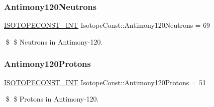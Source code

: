 \subsubsection{\texorpdfstring{Antimony120\+Neutrons}{Antimony120Neutrons}}
{\footnotesize\ttfamily \mbox{\hyperlink{group___isotope_const-_macros_ga5f18360b3e99483a35c32d789e62621c}{I\+S\+O\+T\+O\+P\+E\+C\+O\+N\+S\+T\+\_\+\+I\+NT}} Isotope\+Const\+::\+Antimony120\+Neutrons = 69}

\$ \$ Neutrons in Antimony-\/120. \mbox{\label{group___isotope_const-_antimony-_sb120_gab80ec5d7710e7b3fb6d69632f948da6b}} 
\subsubsection{\texorpdfstring{Antimony120\+Protons}{Antimony120Protons}}
{\footnotesize\ttfamily \mbox{\hyperlink{group___isotope_const-_macros_ga5f18360b3e99483a35c32d789e62621c}{I\+S\+O\+T\+O\+P\+E\+C\+O\+N\+S\+T\+\_\+\+I\+NT}} Isotope\+Const\+::\+Antimony120\+Protons = 51}

\$ \$ Protons in Antimony-\/120. 